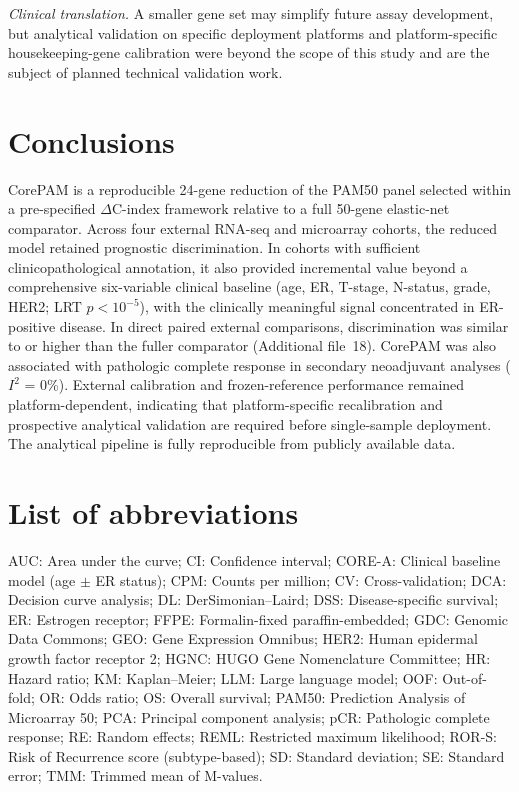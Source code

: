 \documentclass[pdflatex,sn-vancouver-num]{sn-jnl}
\begin{document}
\textit{Clinical translation.} A smaller gene set may simplify future assay development, but analytical validation on specific deployment platforms and platform-specific housekeeping-gene calibration were beyond the scope of this study and are the subject of planned technical validation work.

\section{Conclusions}\label{sec:conclusions}

CorePAM is a reproducible 24-gene reduction of the PAM50 panel selected within a pre-specified $\Delta$C-index framework relative to a full 50-gene elastic-net comparator. Across four external RNA-seq and microarray cohorts, the reduced model retained prognostic discrimination. In cohorts with sufficient clinicopathological annotation, it also provided incremental value beyond a comprehensive six-variable clinical baseline (age, ER, T-stage, N-status, grade, HER2; LRT $p < 10^{-5}$), with the clinically meaningful signal concentrated in ER-positive disease. In direct paired external comparisons, discrimination was similar to or higher than the fuller comparator (Additional file~18). CorePAM was also associated with pathologic complete response in secondary neoadjuvant analyses ($I^2$ = 0\%). External calibration and frozen-reference performance remained platform-dependent, indicating that platform-specific recalibration and prospective analytical validation are required before single-sample deployment. The analytical pipeline is fully reproducible from publicly available data.

\backmatter

\section*{List of abbreviations}

\noindent
AUC: Area under the curve;
CI: Confidence interval;
CORE-A: Clinical baseline model (age $\pm$ ER status);
CPM: Counts per million;
CV: Cross-validation;
DCA: Decision curve analysis;
DL: DerSimonian--Laird;
DSS: Disease-specific survival;
ER: Estrogen receptor;
FFPE: Formalin-fixed paraffin-embedded;
GDC: Genomic Data Commons;
GEO: Gene Expression Omnibus;
HER2: Human epidermal growth factor receptor 2;
HGNC: HUGO Gene Nomenclature Committee;
HR: Hazard ratio;
KM: Kaplan--Meier;
LLM: Large language model;
OOF: Out-of-fold;
OR: Odds ratio;
OS: Overall survival;
PAM50: Prediction Analysis of Microarray 50;
PCA: Principal component analysis;
pCR: Pathologic complete response;
RE: Random effects;
REML: Restricted maximum likelihood;
ROR-S: Risk of Recurrence score (subtype-based);
SD: Standard deviation;
SE: Standard error;
TMM: Trimmed mean of M-values.
\end{document}
